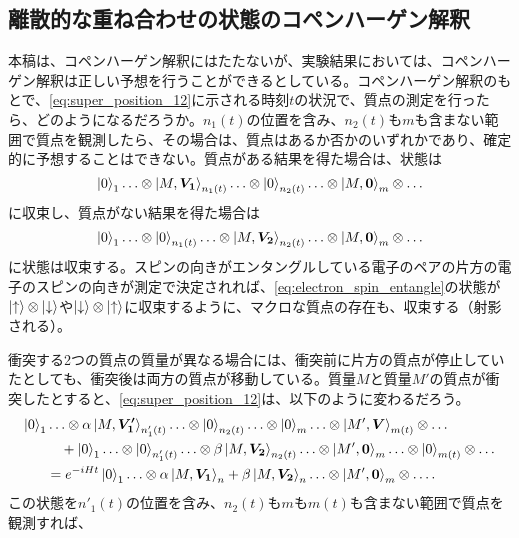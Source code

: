 \subsection{離散的な重ね合わせの状態のコペンハーゲン解釈}
本稿は、コペンハーゲン解釈にはたたないが、実験結果においては、コペンハーゲン解釈は正しい予想を行うことができるとしている。コペンハーゲン解釈のもとで、\eqref{eq:super_position_12}に示される時刻$t$の状況で、質点の測定を行ったら、どのようになるだろうか。$n_1(t)$の位置を含み、$n_2(t)$も$m$も含まない範囲で質点を観測したら、その場合は、質点はあるか否かのいずれかであり、確定的に予想することはできない。質点がある結果を得た場合は、状態は
\begin{equation}
    \ket{0}_1 \ldots \otimes \ket{M,\bm{V_1}}_{n_1(t)} \ldots \otimes \ket{0}_{n_2(t)}  \ldots \otimes \ket{M,\bm{0}}_m \otimes\ldots 
\end{equation}
に収束し、質点がない結果を得た場合は
\begin{equation}
    \ket{0}_1 \ldots \otimes \ket{0}_{n_1(t)} \ldots \otimes \ket{M,\bm{V_2}}_{n_2(t)}  \ldots \otimes \ket{M,\bm{0}}_m \otimes \ldots \nonumber
\end{equation}
に状態は収束する。スピンの向きがエンタングルしている電子のペアの片方の電子のスピンの向きが測定で決定されれば、\eqref{eq:electron_spin_entangle}の状態が$\ket{\uparrow} \otimes \ket{\downarrow}$や$\ket{\downarrow} \otimes \ket{\uparrow}$に収束するように、マクロな質点の存在も、収束する（射影される）。\par
衝突する2つの質点の質量が異なる場合には、衝突前に片方の質点が停止していたとしても、衝突後は両方の質点が移動している。質量$M$と質量$M'$の質点が衝突したとすると、\eqref{eq:super_position_12}は、以下のように変わるだろう。
\begin{align}
    \label{eq:super_position_12_diffrent_mass}
    \ket{0}_1 & \ldots \otimes \alpha \ket{M,\bm{V_1'}}_{n'_1(t)} \ldots \otimes \ket{0}_{n_2(t)}  \ldots \otimes \ket{0}_m \ldots \otimes \ket{M',\bm{V}}_{m(t)} \otimes\ldots \\
    & \quad + \ket{0}_1 \ldots \otimes \ket{0}_{n'_1(t)} \ldots \otimes \beta \ket{M,\bm{V_2}}_{n_2(t)}  \ldots \otimes \ket{M',\bm{0}}_m \ldots \otimes \ket{0}_{m(t)} \otimes \ldots \nonumber \\
    &=e^{-iHt}\ket{0}_1 \ldots \otimes \alpha \ket{M,\bm{V_1}}_n + \beta \ket{M,\bm{V_2}}_n \ldots \otimes \ket{M',\bm{0}}_m \otimes \ldots .\nonumber
\end{align}
この状態を$n'_1(t)$の位置を含み、$n_2(t)$も$m$も$m(t)$も含まない範囲で質点を観測すれば、

